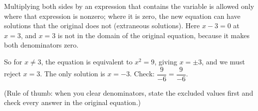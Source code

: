 Multiplying both sides by an expression that contains the variable is allowed only where that expression is nonzero; where it is zero, the new equation can have solutions that the original does not (extraneous solutions). Here $x-3=0$ at $x=3$, and $x=3$ is not in the domain of the original equation, because it makes both denominators zero.

So for $x\ne3$, the equation is equivalent to $x^2=9$, giving $x=\pm3$, and we must reject $x=3$. The only solution is $\boxed{x=-3}$. Check: $\dfrac{9}{-6}=\dfrac{9}{-6}$.

(Rule of thumb: when you clear denominators, state the excluded values first and check every answer in the original equation.)
